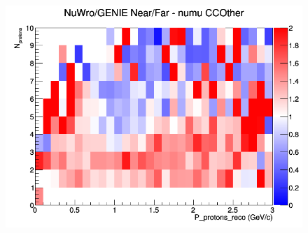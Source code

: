 \begin{figure}[h]
\endminipage
{}
\includegraphics[width=\linewidth]{eff_N_P/FGT/protons/ratios/CCOther_NuWro_GENIE_numu_NF_N_P.png}
\endminipage
\newline
\end{figure}
\clearpage
